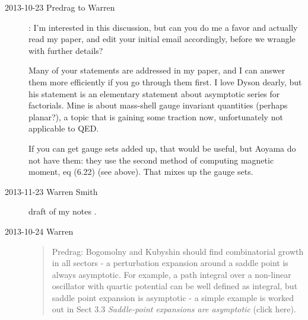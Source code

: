 \begin{description}
\item[2013-10-23 Predrag to Warren]:
I'm interested in this discussion, but can you do me a
favor and actually read my paper, and edit your initial email
accordingly, before we wrangle with further details?

Many of your statements are addressed in my paper, and I can answer them
more efficiently if you go through them first. I love Dyson dearly, but
his statement is an elementary statement about asymptotic series for
factorials. Mine is about mass-shell gauge invariant quantities (perhaps
planar?), a topic that is gaining some traction now, unfortunately not
applicable to QED.

If you can get gauge sets added up, that would be useful, but Aoyama
\etal{} do not have them: they  use the second
method of computing magnetic moment,
{eq (6.22)} (see  above).
That mixes up the gauge sets.



\item[2013-11-23 Warren Smith]
 {draft of my notes} .

\item[2013-10-24 Warren]
\begin{quote} Predrag:
   Bogomolny and Kubyshin should find combinatorial growth
   in all sectors - a perturbation expansion around a saddle point is
   always asymptotic. For example, a path integral over a non-linear
   oscillator with quartic potential can be well defined as integral, but
   saddle point expansion is asymptotic - a simple example is worked out
   in Sect 3.3 {\em Saddle-point expansions are asymptotic}
    {(click
   here)}.


\end{quote}
\end{description}
